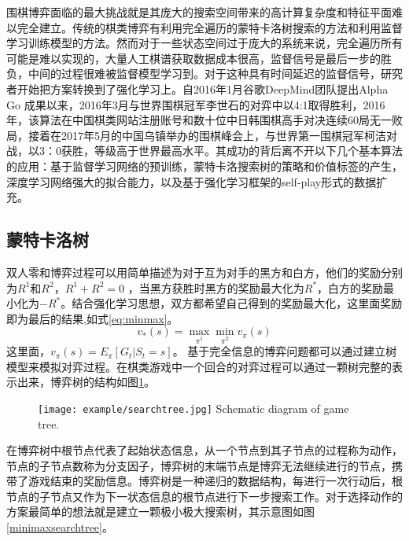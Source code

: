 围棋博弈面临的最大挑战就是其庞大的搜索空间带来的高计算复杂度和特征平面难以完全建立。传统的棋类博弈有利用完全遍历的蒙特卡洛树搜索的方法和利用监督学习训练模型的方法。然而对于一些状态空间过于庞大的系统来说，完全遍历所有可能是难以实现的，大量人工棋谱获取数据成本很高，监督信号是最后一步的胜负，中间的过程很难被监督模型学习到。对于这种具有时间延迟的监督信号，研究者开始把方案转换到了强化学习上。自2016年1月谷歌DeepMind团队提出Alpha Go 成果以来，2016年3月与世界围棋冠军李世石的对弈中以4:1取得胜利，2016年，该算法在中国棋类网站注册账号和数十位中日韩围棋高手对决连续60局无一败局，接着在2017年5月的中国乌镇举办的围棋峰会上，与世界第一围棋冠军柯洁对战，以3：0获胜，等级高于世界最高水平。其成功的背后离不开以下几个基本算法的应用：基于监督学习网络的预训练，蒙特卡洛搜索树的策略和价值标签的产生，深度学习网络强大的拟合能力，以及基于强化学习框架的self-play形式的数据扩充。
\subsection{蒙特卡洛树}
双人零和博弈过程可以用简单描述为对于互为对手的黑方和白方，他们的奖励分别为$R^1$和$R^2$，$R^1+R^2=0$ ，当黑方获胜时黑方的奖励最大化为$R^*$，白方的奖励最小化为$-R^*$。结合强化学习思想，双方都希望自己得到的奖励最大化，这里面奖励即为最后的结果,如式\ref{eq:minmax}。
\begin{equation}
\label{eq:minmax}
{v_*}(s) = \mathop {\max }\limits_{{\pi ^1}} \mathop {\min }\limits_{{\pi ^2}} {v_\pi }(s)
\end{equation}
这里面，${v_\pi }(s) = {E_\pi }[{G_t}|{S_t} = s]$。
基于完全信息的博弈问题都可以通过建立树模型来模拟对弈过程。在棋类游戏中一个回合的对弈过程可以通过一颗树完整的表示出来，博弈树的结构如图\ref{fig:tree}。
\begin{figure}[htbp]
	\centering
	\texttt{[image: example/searchtree.jpg]}
	{Schematic diagram of game tree.}
	\label{fig:tree}
\end{figure}

在博弈树中根节点代表了起始状态信息，从一个节点到其子节点的过程称为动作，节点的子节点数称为分支因子，博弈树的末端节点是博弈无法继续进行的节点，携带了游戏结束的奖励信息。博弈树是一种递归的数据结构，每进行一次行动后，根节点的子节点又作为下一状态信息的根节点进行下一步搜索工作。对于选择动作的方案最简单的想法就是建立一颗极小极大搜索树，其示意图如图\ref{minimaxsearchtree}。

